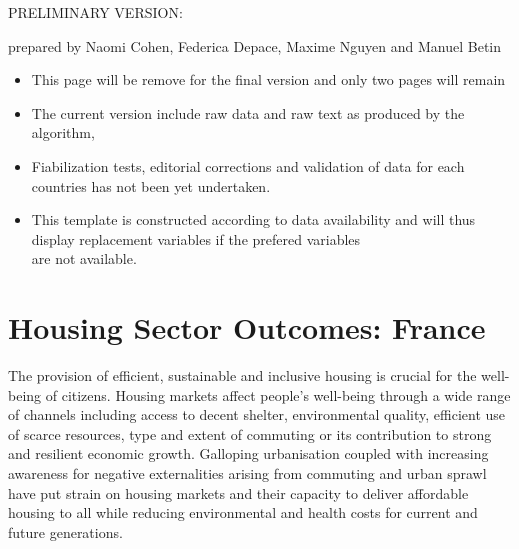 \documentclass[]{article}
\author{}
\date{\vspace{-2.5em}}
\begin{document}

\newpage

\bigskip

PRELIMINARY VERSION:

prepared by Naomi Cohen, Federica Depace, Maxime Nguyen and Manuel Betin

\begin{itemize}
\item
  This page will be remove for the final version and only two pages will
  remain
\item
  The current version include raw data and raw text as produced by the
  algorithm,
\item
  Fiabilization tests, editorial corrections and validation of data for
  each countries has not been yet undertaken.
\item
  This template is constructed according to data availability and will
  thus display replacement variables if the prefered variables\\
  are not available.
\end{itemize}

\newpage

\color{ultramarineblue} \section{Housing Sector Outcomes: \Large France}

\color{black}

The provision of efficient, sustainable and inclusive housing is crucial
for the well-being of citizens. Housing markets affect people's
well-being through a wide range of channels including access to decent
shelter, environmental quality, efficient use of scarce resources, type
and extent of commuting or its contribution to strong and resilient
economic growth. Galloping urbanisation coupled with increasing
awareness for negative externalities arising from commuting and urban
sprawl have put strain on housing markets and their capacity to deliver
affordable housing to all while reducing environmental and health costs
for current and future generations.
\end{document}
